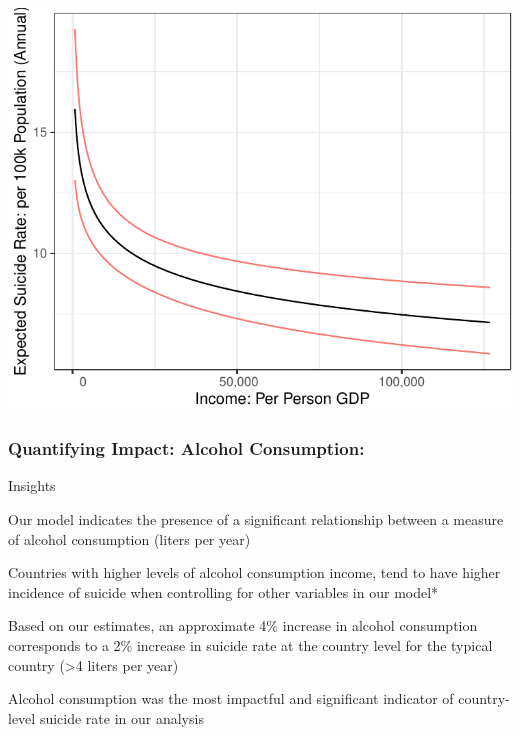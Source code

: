 \documentclass[]{article}
\begin{document}
\begin{center}\includegraphics{Project_Report_files/figure-latex/agdp_plot-1} \end{center}

\subsubsection{Quantifying Impact: Alcohol
Consumption:}\label{quantifying-impact-alcohol-consumption}

Insights

Our model indicates the presence of a significant relationship between a
measure of alcohol consumption (liters per year)

Countries with higher levels of alcohol consumption income, tend to have
higher incidence of suicide when controlling for other variables in our
model*

Based on our estimates, an approximate 4\% increase in alcohol
consumption corresponds to a 2\% increase in suicide rate at the country
level for the typical country (\textgreater{}4 liters per year)

Alcohol consumption was the most impactful and significant indicator of
country-level suicide rate in our analysis
\end{document}
